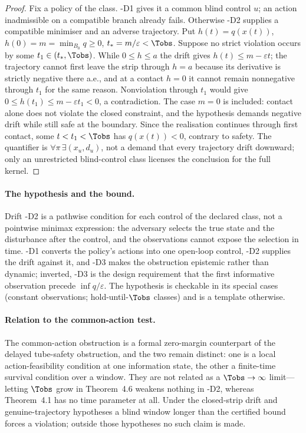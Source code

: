 \begin{proof}
Fix a policy of the class. \hyp{D1} gives it a common blind control $u$; an action inadmissible on a compatible branch already fails. Otherwise \hyp{D2} supplies a compatible minimiser and an adverse trajectory. Put $h(t)=q(x(t))$, $h(0)=m=\min_{B_0}q\ge0$, $t_*=m/\varepsilon<\Tobs$. Suppose no strict violation occurs by some $t_1\in(t_*,\Tobs)$. While $0\le h\le a$ the drift gives $h(t)\le m-\varepsilon t$; the trajectory cannot first leave the strip through $h=a$ because its derivative is strictly negative there a.e., and at a contact $h=0$ it cannot remain nonnegative through $t_1$ for the same reason. Nonviolation through $t_1$ would give $0\le h(t_1)\le m-\varepsilon t_1<0$, a contradiction. The case $m=0$ is included: contact alone does not violate the closed constraint, and the hypothesis demands negative drift while still safe at the boundary. Since the realisation continues through first contact, some $t<t_1<\Tobs$ has $q(x(t))<0$, contrary to safety. The quantifier is $\forall\pi\,\exists(x_u,d_u)$, not a demand that every trajectory drift downward; only an unrestricted blind-control class licenses the conclusion for the full kernel.
\end{proof}

\paragraph{The hypothesis and the bound.} Drift \hyp{D2} is a pathwise condition for each control of the declared class, not a pointwise minimax expression: the adversary selects the true state and the disturbance after the control, and the observations cannot expose the selection in time. \hyp{D1} converts the policy's actions into one open-loop control, \hyp{D2} supplies the drift against it, and \hyp{D3} makes the obstruction epistemic rather than dynamic; inverted, \hyp{D3} is the design requirement that the first informative observation precede $\inf q/\varepsilon$. The hypothesis is checkable in its special cases (constant observations; hold-until-$\Tobs$ classes) and is a template otherwise.

\paragraph{Relation to the common-action test.} The common-action obstruction is a formal zero-margin counterpart of the delayed tube-safety obstruction, and the two remain distinct: one is a local action-feasibility condition at one information state, the other a finite-time survival condition over a window. They are not related as a $\Tobs\to\infty$ limit---letting $\Tobs$ grow in Theorem~4.6 weakens nothing in \hyp{D2}, whereas Theorem~4.1 has no time parameter at all. Under the closed-strip drift and genuine-trajectory hypotheses a blind window longer than the certified bound forces a violation; outside those hypotheses no such claim is made.

